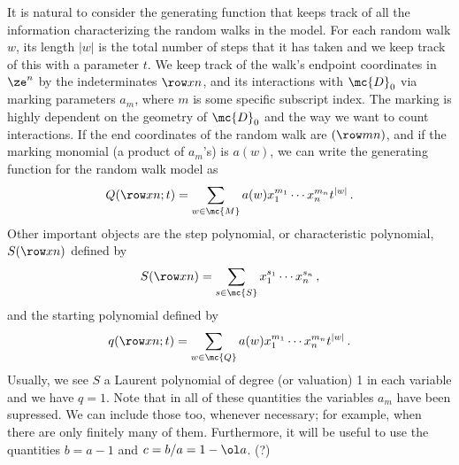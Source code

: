 It is natural to consider the generating function that keeps track of all the information characterizing the random walks in the model. For each random walk $w$, its length $|w|$ is the total number of steps that it has taken and we keep track of this with a parameter $t$. We keep track of the walk's endpoint coordinates in $\ze^n$ by the indeterminates $\row xn$, and its interactions with $\mc{D}_0$ via marking parameters $a_m$, where $m$ is some specific subscript index. The marking is highly dependent on the geometry of $\mc{D}_0$ and the way we want to count interactions. If the end coordinates of the random walk are $(\row mn)$, and if the marking monomial (a product of $a_m$'s) is $a(w)$, we can write the generating  function for the random walk model as
\begin{align}
	Q(\row xn;t) = \sum_{w \in \mc{M}} a(w) x_1^{m_1}\cdots x_n^{m_n} t^{|w|}\,.
\end{align}
Other important objects are the step polynomial, or characteristic polynomial, $S(\row xn)$ defined by
\begin{align}
	S(\row xn) = \sum_{s \in \mc{S}} x_1^{s_1}\cdots x_n^{s_n}\,,
\end{align}
and the starting polynomial defined by
\begin{align}
	q(\row xn;t) = \sum_{w \in \mc{Q}}  a(w) x_1^{m_1}\cdots x_n^{m_n} t^{|w|}\,.
\end{align}
Usually, we see $S$ a Laurent polynomial of degree (or valuation) 1 in each variable and we have $q = 1$. Note that in all of these quantities the variables $a_m$ have been supressed. We can include those too, whenever necessary; for example, when there are only finitely many of them. Furthermore, it will be useful to use the quantities $b = a - 1$ and $c = b/a = 1- \ol a$. (?)
